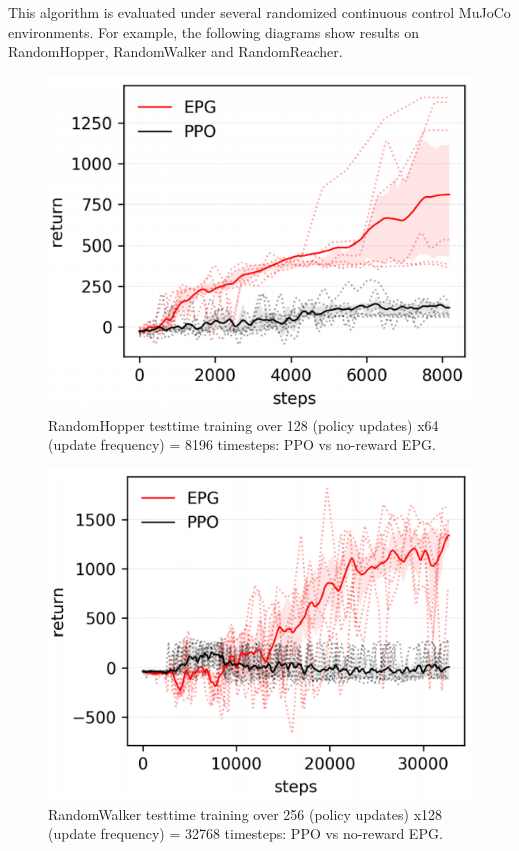 \par
This algorithm is evaluated under several randomized continuous control MuJoCo environments. For example, the following diagrams show results on RandomHopper, RandomWalker and RandomReacher.
\begin{figure}[H]
	\includegraphics[scale=0.5]{hopper.png}
	\centering
	\caption{RandomHopper testtime training over 128 (policy updates) x64 (update frequency) = 8196 timesteps: PPO vs no-reward EPG.}
	\label{hopper}
\end{figure}
\begin{figure}[H]
	\includegraphics[scale=0.5]{walker.png}
	\centering
	\caption{RandomWalker testtime training over 256 (policy updates) x128 (update frequency) = 32768 timesteps: PPO vs no-reward EPG.}
	\label{walker}
\end{figure}
